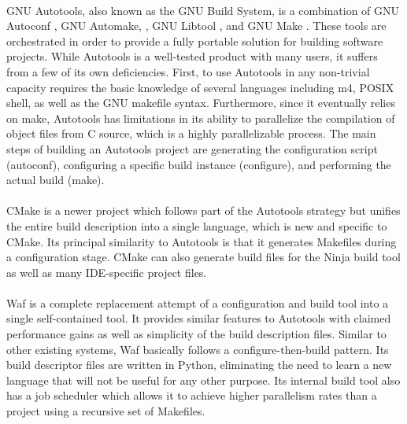 \paragraph{}
GNU Autotools, also known as the GNU Build System, is a combination of GNU Autoconf \cite{gnu-autoconf}, GNU Automake, \cite{gnu-automake}, GNU Libtool \cite{gnu-libtool}, and GNU Make \cite{gnu-make}.
These tools are orchestrated in order to provide a fully portable solution for building software projects.
While Autotools is a well-tested product with many users, it suffers from a few of its own deficiencies.
First, to use Autotools in any non-trivial capacity requires the basic knowledge of several languages including m4, POSIX shell, as well as the GNU makefile syntax.
Furthermore, since it eventually relies on make, Autotools has limitations in its ability to parallelize the compilation of object files from C source, which is a highly parallelizable process.
The main steps of building an Autotools project are generating the configuration script (autoconf), configuring a specific build instance (configure), and performing the actual build (make).

\paragraph{}
CMake is a newer project which follows part of the Autotools strategy but unifies the entire build description into a single language, which is new and specific to CMake.
Its principal similarity to Autotools is that it generates Makefiles during a configuration stage.
CMake can also generate build files for the Ninja build tool as well as many IDE-specific project files.

\paragraph{}
Waf is a complete replacement attempt of a configuration and build tool into a single self-contained tool.
It provides similar features to Autotools with claimed performance gains as well as simplicity of the build description files.
Similar to other existing systems, Waf basically follows a configure-then-build pattern.
Its build descriptor files are written in Python, eliminating the need to learn a new language that will not be useful for any other purpose.
Its internal build tool also has a job scheduler which allows it to achieve higher parallelism rates than a project using a recursive set of Makefiles.

